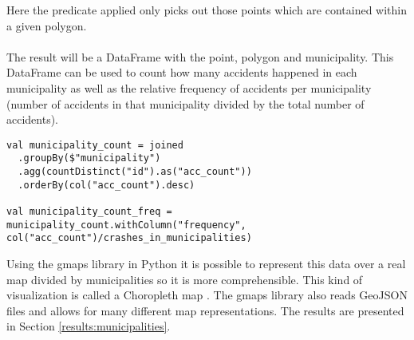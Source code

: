 Here the predicate applied only picks out those points which are contained within a given polygon. 
\\
\\
The result will be a DataFrame with the point, polygon and municipality. This DataFrame can be used to count how many accidents happened in each municipality as well as the relative frequency of accidents per municipality (number of accidents in that municipality divided by the total number of accidents).\\
\begin{lstlisting}[style=myScalastyle]
val municipality_count = joined
  .groupBy($"municipality")
  .agg(countDistinct("id").as("acc_count"))
  .orderBy(col("acc_count").desc)
  
val municipality_count_freq = municipality_count.withColumn("frequency", col("acc_count")/crashes_in_municipalities)
\end{lstlisting}
Using the gmaps library in Python \cite{gmaps} it is possible to represent this data over a real map divided by municipalities so it is more comprehensible. This kind of visualization is called a Choropleth map \cite{chloropeth}. The gmaps library also reads GeoJSON files and allows for many different map representations.
The results are presented in Section \ref{results:municipalities}.

